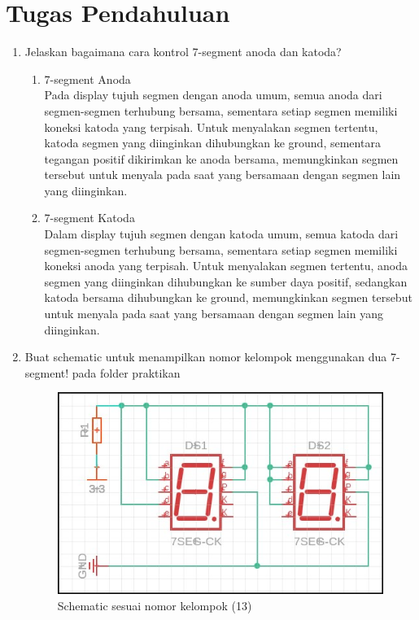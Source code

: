 \section*{Tugas Pendahuluan}
\begin{enumerate}
  \item Jelaskan bagaimana cara kontrol 7-segment anoda dan katoda?
  \begin{enumerate}[label=\alph*.]
    \item 7-segment Anoda \\
    Pada display tujuh segmen dengan anoda umum, semua anoda dari segmen-segmen terhubung bersama, sementara setiap segmen memiliki koneksi katoda yang terpisah. Untuk menyalakan segmen tertentu, katoda segmen yang diinginkan dihubungkan ke ground, sementara tegangan positif dikirimkan ke anoda bersama, memungkinkan segmen tersebut untuk menyala pada saat yang bersamaan dengan segmen lain yang diinginkan.
    
    \item 7-segment Katoda \\
    Dalam display tujuh segmen dengan katoda umum, semua katoda dari segmen-segmen terhubung bersama, sementara setiap segmen memiliki koneksi anoda yang terpisah. Untuk menyalakan segmen tertentu, anoda segmen yang diinginkan dihubungkan ke sumber daya positif, sedangkan katoda bersama dihubungkan ke ground, memungkinkan segmen tersebut untuk menyala pada saat yang bersamaan dengan segmen lain yang diinginkan.
  \end{enumerate}
  \item Buat schematic untuk menampilkan nomor kelompok menggunakan dua 7-segment!
  pada folder praktikan \\
  \begin{figure}[H]
    \centering
    \includegraphics[width=0.6\linewidth]{img/modul_2/schematic_tupen2.jpg}
    \caption{Schematic sesuai nomor kelompok (13)} 
  \end{figure}
\end{enumerate}